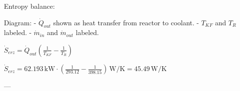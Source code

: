 Entropy balance:  

Diagram:  
- \( \dot{Q}_{out} \) shown as heat transfer from reactor to coolant.  
- \( T_{KF} \) and \( T_R \) labeled.  
- \( \dot{m}_{in} \) and \( \dot{m}_{out} \) labeled.  

\( \dot{S}_{erz} = \dot{Q}_{out} \left( \frac{1}{T_{KF}} - \frac{1}{T_R} \right) \)  

\( \dot{S}_{erz} = 62.193 \, \text{kW} \cdot \left( \frac{1}{293.12} - \frac{1}{398.15} \right) \, \text{W/K} = 45.49 \, \text{W/K} \)  

---